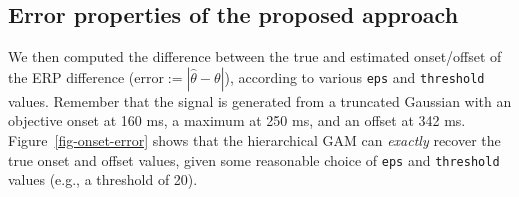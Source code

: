 \documentclass[
  doc,
  floatsintext,
  longtable,
  a4paper,
  nolmodern,
  notxfonts,
  notimes,
  colorlinks=true,linkcolor=blue,citecolor=blue,urlcolor=blue]{apa7}
\newenvironment{Shaded}{\begin{snugshade}}{\end{snugshade}}
\newcommand{\AttributeTok}[1]{\textcolor[rgb]{0.40,0.45,0.13}{#1}}
\newcommand{\CommentTok}[1]{\textcolor[rgb]{0.37,0.37,0.37}{#1}}
\newcommand{\DecValTok}[1]{\textcolor[rgb]{0.68,0.00,0.00}{#1}}
\newcommand{\FloatTok}[1]{\textcolor[rgb]{0.68,0.00,0.00}{#1}}
\newcommand{\FunctionTok}[1]{\textcolor[rgb]{0.28,0.35,0.67}{#1}}
\newcommand{\NormalTok}[1]{\textcolor[rgb]{0.00,0.23,0.31}{#1}}
\newcommand{\OtherTok}[1]{\textcolor[rgb]{0.00,0.23,0.31}{#1}}
\newcommand{\SpecialCharTok}[1]{\textcolor[rgb]{0.37,0.37,0.37}{#1}}
\newcommand{\StringTok}[1]{\textcolor[rgb]{0.13,0.47,0.30}{#1}}
\begin{document}
\begin{Shaded}
\end{Shaded}

\subsection{Error properties of the proposed
approach}\label{error-properties-of-the-proposed-approach}

We then computed the difference between the true and estimated
onset/offset of the ERP difference
(\(\text{error}:=|\hat{\theta}-\theta|\)), according to various
\texttt{eps} and \texttt{threshold} values. Remember that the signal is
generated from a truncated Gaussian with an objective onset at 160 ms, a
maximum at 250 ms, and an offset at 342 ms. Figure~\ref{fig-onset-error}
shows that the hierarchical GAM can \emph{exactly} recover the true
onset and offset values, given some reasonable choice of \texttt{eps}
and \texttt{threshold} values (e.g., a threshold of 20).
\end{document}

